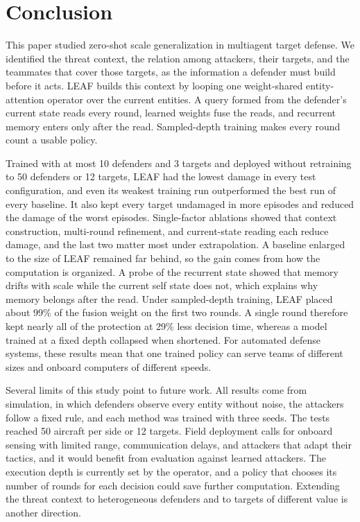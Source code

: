 
\section{Conclusion}
\label{sec:conclusion}

This paper studied zero-shot scale generalization in multiagent target defense. We identified the threat context, the relation among attackers, their targets, and the teammates that cover those targets, as the information a defender must build before it acts. LEAF builds this context by looping one weight-shared entity-attention operator over the current entities. A query formed from the defender's current state reads every round, learned weights fuse the reads, and recurrent memory enters only after the read. Sampled-depth training makes every round count a usable policy.

Trained with at most 10 defenders and 3 targets and deployed without retraining to 50 defenders or 12 targets, LEAF had the lowest damage in every test configuration, and even its weakest training run outperformed the best run of every baseline. It also kept every target undamaged in more episodes and reduced the damage of the worst episodes. Single-factor ablations showed that context construction, multi-round refinement, and current-state reading each reduce damage, and the last two matter most under extrapolation. A baseline enlarged to the size of LEAF remained far behind, so the gain comes from how the computation is organized. A probe of the recurrent state showed that memory drifts with scale while the current self state does not, which explains why memory belongs after the read. Under sampled-depth training, LEAF placed about 99\% of the fusion weight on the first two rounds. A single round therefore kept nearly all of the protection at 29\% less decision time, whereas a model trained at a fixed depth collapsed when shortened. For automated defense systems, these results mean that one trained policy can serve teams of different sizes and onboard computers of different speeds.

Several limits of this study point to future work. All results come from simulation, in which defenders observe every entity without noise, the attackers follow a fixed rule, and each method was trained with three seeds. The tests reached 50 aircraft per side or 12 targets. Field deployment calls for onboard sensing with limited range, communication delays, and attackers that adapt their tactics, and it would benefit from evaluation against learned attackers. The execution depth is currently set by the operator, and a policy that chooses its number of rounds for each decision could save further computation. Extending the threat context to heterogeneous defenders and to targets of different value is another direction.
